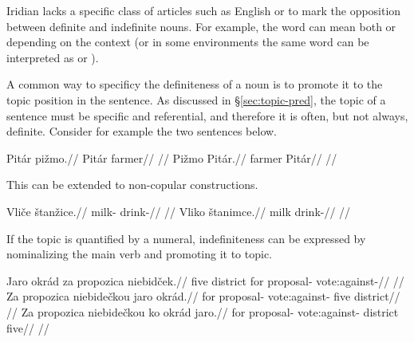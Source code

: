 Iridian lacks a specific class of articles such as English
 or  to mark the opposition between definite and indefinite
nouns. For example, the word  can mean both  or  depending on the context (or in some environments the same word can be
interpreted as   or ).

A common way to specificy the definiteness of a noun is to promote it to the
topic position in the sentence. As discussed in \S\ref{sec:topic-pred}, the
topic of a sentence must be specific and referential, and therefore it is often,
but not always, definite. Consider for example the two sentences below.

\begin{multicols}{2}
  \pex
  \a
  \begingl
  \gla Pit\'ar pi\v{z}mo.//
  \glb Pit\'ar farmer//
  \glft {}//
  \endgl
  \a
  \begingl
  \gla Pi\v{z}mo Pit\'ar.//
  \glb farmer Pit\'ar//
  \glft {}//
  \endgl
  \xe
\end{multicols}

This can be extended to non-copular constructions.

\begin{multicols}{2}
  \pex
  \a
  \begingl
  \gla Vli\v{c}e \v{s}tan\v{z}ice.//
  \glb milk- drink-//
  \glft {}//
  \endgl
  \a
  \begingl
  \gla Vliko \v{s}tanimce.//
  \glb milk drink-//
  \glft {}//
  \endgl
  \xe
\end{multicols}

If the topic is quantified by a numeral, indefiniteness can be expressed by nominalizing the main verb and promoting it to topic.

\pex
\a
\begingl
\gla Jaro okr\'ad za propozica niebid\v{c}ek.//
\glb five district for proposal- vote:against-//
\glft {}//
\endgl
\a
\begingl
\gla Za propozica niebide\v{c}kou jaro okr\'ad.//
\glb for proposal- vote:against- five district//
\glft {}//
\endgl
\a
\begingl
\gla Za propozica niebide\v{c}kou ko okr\'ad jaro.//
\glb for proposal- vote:against-  district five//
\glft {}//
\endgl
\xe

